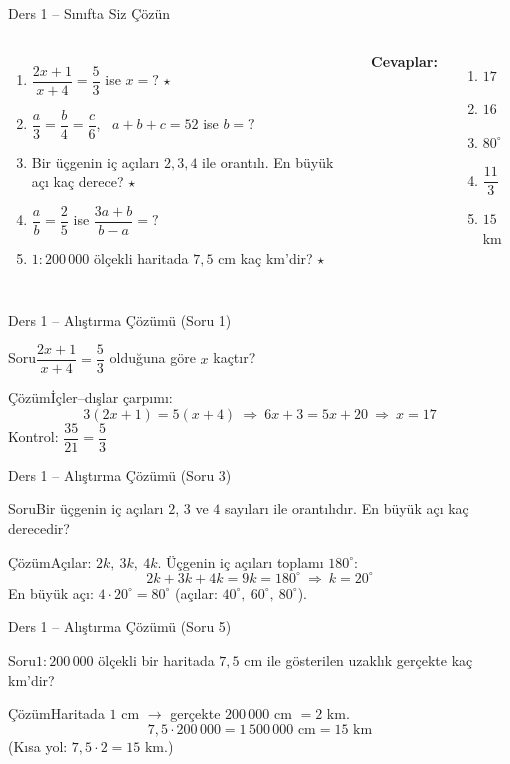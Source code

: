 \documentclass[aspectratio=169,11pt,handout]{beamer}
\newcommand{\soru}[3]{%
\begin{frame}{#1}
  \begin{block}{Soru}\large #2\end{block}
  \pause
  \begin{exampleblock}{Çözüm}\large #3\end{exampleblock}
\end{frame}}
\begin{document}
\begin{frame}{Ders 1 -- Sınıfta Siz Çözün}
\begin{columns}[t]
\begin{enumerate}
\item \(\dfrac{2x+1}{x+4}=\dfrac{5}{3}\) ise \(x=?\) \(\star\)
\item \(\dfrac{a}{3}=\dfrac{b}{4}=\dfrac{c}{6}\), \ \(a+b+c=52\) ise \(b=?\)
\item Bir üçgenin iç açıları \(2,3,4\) ile orantılı. En büyük açı kaç derece? \(\star\)
\item \(\dfrac{a}{b}=\dfrac{2}{5}\) ise \(\dfrac{3a+b}{b-a}=?\)
\item \(1:200\,000\) ölçekli haritada \(7{,}5\) cm kaç km'dir? \(\star\)
\end{enumerate}
\pause
\textbf{Cevaplar:}
\begin{enumerate}
\item \(17\)
\item \(16\)
\item \(80^\circ\)
\item \(\dfrac{11}{3}\)
\item \(15\) km
\end{enumerate}
\end{columns}
\vspace{4pt}{\footnotesize \(\star\) işaretli soruların adım adım çözümü sonraki slaytlardadır.}
\end{frame}

\soru{Ders 1 -- Alıştırma Çözümü (Soru 1)}
{\(\dfrac{2x+1}{x+4}=\dfrac{5}{3}\) olduğuna göre \(x\) kaçtır?}
{İçler--dışlar çarpımı:
\[3(2x+1)=5(x+4)\ \Rightarrow\ 6x+3=5x+20\ \Rightarrow\ x=17\]
Kontrol: \(\dfrac{35}{21}=\dfrac{5}{3}\) \checkmark}

\soru{Ders 1 -- Alıştırma Çözümü (Soru 3)}
{Bir üçgenin iç açıları \(2\), \(3\) ve \(4\) sayıları ile orantılıdır. En büyük açı kaç derecedir?}
{Açılar: \(2k,\ 3k,\ 4k\). Üçgenin iç açıları toplamı \(180^\circ\):
\[2k+3k+4k=9k=180^\circ\ \Rightarrow\ k=20^\circ\]
En büyük açı: \(4\cdot 20^\circ=80^\circ\) \quad (açılar: \(40^\circ,\ 60^\circ,\ 80^\circ\)).}

\soru{Ders 1 -- Alıştırma Çözümü (Soru 5)}
{\(1:200\,000\) ölçekli bir haritada \(7{,}5\) cm ile gösterilen uzaklık gerçekte kaç km'dir?}
{Haritada \(1\) cm \(\rightarrow\) gerçekte \(200\,000\) cm \(=2\) km.
\[7{,}5\cdot 200\,000=1\,500\,000\text{ cm}=15\text{ km}\]
(Kısa yol: \(7{,}5\cdot 2=15\) km.)}
\end{document}
